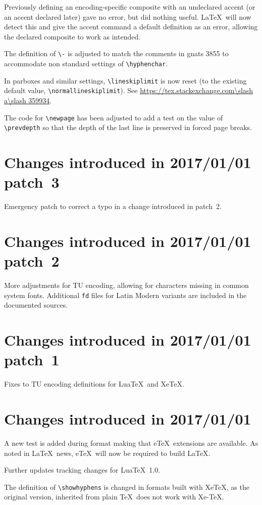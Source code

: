 \documentclass{ltxguide}
\newcommand\gnatsissue[1]{gnats #1}
\newcommand\sxanswer[1]{\url{https://tex.stackexchange.com\slash a\slash #1}}
\newcommand\gnatsissue[1]{%
    \href{https://www.latex-project.org/cgi-bin/ltxbugs2html?pr=latex/#1}{gnats #1}}
\newcommand\sxanswer[1]{%
     \url{https://tex.stackexchange.com/a/#1}}
\begin{document}
Previously defining an encoding-specific composite with an undeclared
accent (or an accent declared later) gave no error, but did nothing useful.
\LaTeX\ will now detect this and give the accent command a default definition
as an error, allowing the declared composite to work as intended.

The definition of \verb|\-| is adjusted to match the comments in
\gnatsissue{3855} to accommodate non standard settings of \verb|\hyphenchar|.

In parboxes and similar settings, \verb|\lineskiplimit| is now
reset (to the existing default value, \verb|\normallineskiplimit|).
See \sxanswer{359934}.

 The code for \verb|\newpage| has been adjusted to add a test on the value of
\verb|\prevdepth| so that the depth of the last line is preserved in
forced page breaks.

\section{Changes  introduced in 2017/01/01 patch~3}
Emergency patch to correct a typo in a change introduced in patch~2.

\section{Changes  introduced in 2017/01/01 patch~2}
More adjustments for TU encoding, allowing for characters missing in
common system fonts. Additional \texttt{fd} files
for Latin Modern variants are included in the documented sources.

\section{Changes  introduced in 2017/01/01 patch~1}
Fixes to TU encoding definitions for Lua\TeX\ and Xe\TeX.

\section{Changes  introduced in 2017/01/01}

A new test is added during format making that e\TeX\ extensions are
available. As noted in \LaTeX\ news, e\TeX\ will now be required to
build \LaTeX.

Further updates tracking changes for Lua\TeX~1.0.

The definition of \verb|\showhyphens| is changed in formats built
with Xe\TeX, as the original version, inherited from plain \TeX\ does
not work with Xe-\TeX.
\end{document}
